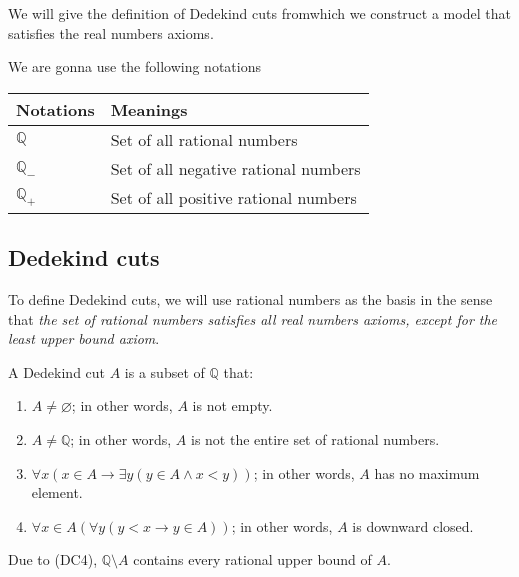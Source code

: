 \par We will give the definition of Dedekind cuts fromwhich we construct a model that satisfies the real numbers axioms.

\par We are gonna use the following notations
\begin{table}[htp]
    \centering
    \begin{tabular}{ll}
        Notations        & Meanings                             \\
        \bottomrule
        \toprule
        $\mathbb{Q}$     & Set of all rational numbers          \\
        $\mathbb{Q}_{-}$ & Set of all negative rational numbers \\
        $\mathbb{Q}_{+}$ & Set of all positive rational numbers
    \end{tabular}
\end{table}

\subsection*{Dedekind cuts}

\par To define Dedekind cuts, we will use rational numbers as the basis in the sense that \textit{the set of rational numbers satisfies all real numbers axioms, except for the least upper bound axiom}.

\begin{definition}
    A Dedekind cut $A$ is a subset of $\mathbb{Q}$ that:
    \begin{enumerate}[label = (DC\arabic*)]
        \item $A\ne\varnothing$; in other words, $A$ is not empty.
        \item $A\neq\mathbb{Q}$; in other words, $A$ is not the entire set of rational numbers.
        \item $\forall x\left(x\in A \rightarrow \exists y \left( y\in A \wedge x < y \right)\right)$; in other words, $A$ has no maximum element.
        \item $\forall x\in A\left(\forall y( y < x \rightarrow y\in A)\right)$; in other words, $A$ is downward closed.
    \end{enumerate}
\end{definition}

\par Due to (DC4), $\mathbb{Q}\setminus A$ contains every rational upper bound of $A$.

